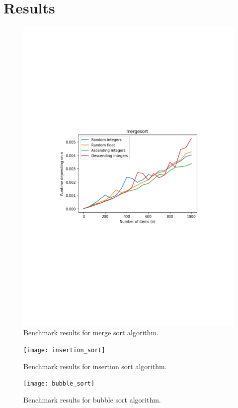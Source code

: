 \documentclass[sigconf, nonacm, natbib, screen, balance=False]{acmart}
\begin{document}
\section{Results}\label{sec:results}

\begin{figure}
  \centering
  \includegraphics{mergesort}
  \caption{Benchmark results for merge sort algorithm.}
  \label{fig:bench}
\end{figure}

\begin{figure}
  \centering
  \texttt{[image: insertion\_sort]}
  \caption{Benchmark results for insertion sort algorithm.}
  \label{fig:bench}
\end{figure}

\begin{figure}
  \centering
  \texttt{[image: bubble\_sort]}
  \caption{Benchmark results for bubble sort algorithm.}
  \label{fig:bench}
\end{figure}
\end{document}
